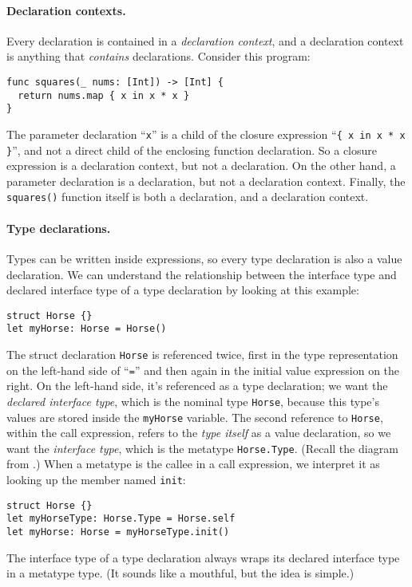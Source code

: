 \documentclass[../generics]{subfiles}
\begin{document}
\paragraph{Declaration contexts.} Every declaration is contained in a \emph{declaration context}, and a declaration context is anything that \emph{contains} declarations. Consider this program:
\begin{Verbatim}
func squares(_ nums: [Int]) -> [Int] {
  return nums.map { x in x * x }
}
\end{Verbatim}
The parameter declaration ``\texttt{x}'' is a child of the closure expression ``\verb|{ x in x * x }|'', and not a direct child of the enclosing function declaration. So a closure expression is a declaration context, but not a declaration. On the other hand, a parameter declaration is a declaration, but not a declaration context. Finally, the \texttt{squares()} function itself is both a declaration, and a declaration context.

\paragraph{Type declarations.} Types can be written inside expressions, so every type declaration is also a value declaration. We can understand the relationship between the interface type and declared interface type of a type declaration by looking at this example:
\begin{Verbatim}
struct Horse {}
let myHorse: Horse = Horse()
\end{Verbatim}
The struct declaration \texttt{Horse} is referenced twice, first in the type representation on the left-hand side of ``\texttt{=}'' and then again in the initial value expression on the right. On the left-hand side, it's referenced as a type declaration; we want the \emph{declared interface type}, which is the nominal type \texttt{Horse}, because this type's values are stored inside the \texttt{myHorse} variable. The second reference to \texttt{Horse}, within the call expression, refers to the \emph{type itself} as a value declaration, so we want the \emph{interface type}, which is the metatype \texttt{Horse.Type}. (Recall the diagram from .) When a metatype is the callee in a call expression, we interpret it as looking up the member named \texttt{init}:
\begin{Verbatim}
struct Horse {}
let myHorseType: Horse.Type = Horse.self
let myHorse: Horse = myHorseType.init()
\end{Verbatim}
The interface type of a type declaration always wraps its declared interface type in a metatype type. (It sounds like a mouthful, but the idea is simple.)
\end{document}
